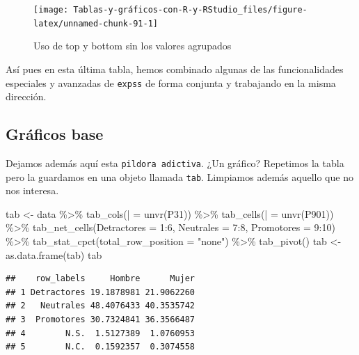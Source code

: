 \documentclass[
]{book}
\newenvironment{Shaded}{\begin{snugshade}}{\end{snugshade}}
\newcommand{\AttributeTok}[1]{\textcolor[rgb]{0.77,0.63,0.00}{#1}}
\newcommand{\DecValTok}[1]{\textcolor[rgb]{0.00,0.00,0.81}{#1}}
\newcommand{\FunctionTok}[1]{\textcolor[rgb]{0.00,0.00,0.00}{#1}}
\newcommand{\NormalTok}[1]{#1}
\newcommand{\OtherTok}[1]{\textcolor[rgb]{0.56,0.35,0.01}{#1}}
\newcommand{\SpecialCharTok}[1]{\textcolor[rgb]{0.00,0.00,0.00}{#1}}
\newcommand{\StringTok}[1]{\textcolor[rgb]{0.31,0.60,0.02}{#1}}
\begin{document}
\begin{figure}[H]

{\centering \texttt{[image: Tablas-y-gráficos-con-R-y-RStudio\_files/figure-latex/unnamed-chunk-91-1]} 

}

\caption{Uso de top y bottom sin los valores agrupados}\label{fig:unnamed-chunk-91}
\end{figure}

Así pues en esta última tabla, hemos combinado algunas de las funcionalidades especiales y avanzadas de \texttt{expss} de forma conjunta y trabajando en la misma dirección.

\hypertarget{gruxe1ficos-base}{%
\subsection{Gráficos base}\label{gruxe1ficos-base}}

Dejamos además aquí esta \texttt{pildora\ adictiva}. ¿Un gráfico? Repetimos la tabla pero la guardamos en una objeto llamada \texttt{tab}. Limpiamos además aquello que no nos interesa.

\begin{Shaded}
\begin{Highlighting}[]
\NormalTok{tab }\OtherTok{\textless{}{-}}\NormalTok{ data }\SpecialCharTok{\%\textgreater{}\%} \FunctionTok{tab\_cols}\NormalTok{(}\StringTok{\textasciigrave{}}\AttributeTok{|}\StringTok{\textasciigrave{}} \OtherTok{=} \FunctionTok{unvr}\NormalTok{(P31)) }\SpecialCharTok{\%\textgreater{}\%} \FunctionTok{tab\_cells}\NormalTok{(}\StringTok{\textasciigrave{}}\AttributeTok{|}\StringTok{\textasciigrave{}} \OtherTok{=} \FunctionTok{unvr}\NormalTok{(P901)) }\SpecialCharTok{\%\textgreater{}\%} 
  \FunctionTok{tab\_net\_cells}\NormalTok{(}\AttributeTok{Detractores =} \DecValTok{1}\SpecialCharTok{:}\DecValTok{6}\NormalTok{, }\AttributeTok{Neutrales =} \DecValTok{7}\SpecialCharTok{:}\DecValTok{8}\NormalTok{, }\AttributeTok{Promotores =} \DecValTok{9}\SpecialCharTok{:}\DecValTok{10}\NormalTok{) }\SpecialCharTok{\%\textgreater{}\%} 
  \FunctionTok{tab\_stat\_cpct}\NormalTok{(}\AttributeTok{total\_row\_position =} \StringTok{"none"}\NormalTok{) }\SpecialCharTok{\%\textgreater{}\%} \FunctionTok{tab\_pivot}\NormalTok{()}
\NormalTok{tab }\OtherTok{\textless{}{-}} \FunctionTok{as.data.frame}\NormalTok{(tab)}
\NormalTok{tab}
\end{Highlighting}
\end{Shaded}

\begin{verbatim}
##    row_labels     Hombre      Mujer
## 1 Detractores 19.1878981 21.9062260
## 2   Neutrales 48.4076433 40.3535742
## 3  Promotores 30.7324841 36.3566487
## 4        N.S.  1.5127389  1.0760953
## 5        N.C.  0.1592357  0.3074558
\end{verbatim}
\end{document}
